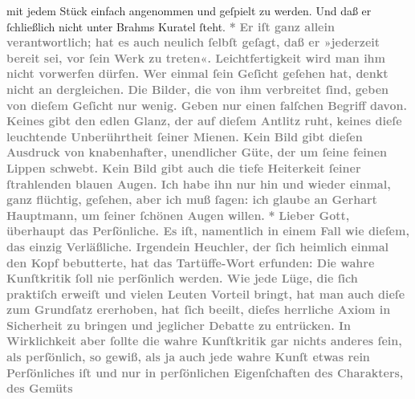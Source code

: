 \begin{ledgroupsized}[t]{13cm}
{{                  mit jedem Stück einfach angenommen und geſpielt zu werden. Und daß er ſchließlich
                  nicht unter Brahms Kuratel ſteht.}}\pend
           \pstart
           \centering{}\textcolor{gray}{\textbf{*}}\pend
           \pstart
           \noindent{}\textcolor{gray}{\textbf{Er iſt ganz allein verantwortlich; hat es auch neulich ſelbſt
                  geſagt, daß er »jederzeit bereit sei, vor ſein Werk zu treten«. Leichtfertigkeit
                  wird man ihm nicht vorwerfen dürfen. Wer einmal ſein Geſicht geſehen hat, denkt
                  nicht an dergleichen. Die Bilder, die von ihm verbreitet ſind, geben von dieſem
                  Geſicht nur wenig. Geben nur einen falſchen Begriff davon. Keines gibt den edlen
                  Glanz, der auf dieſem Antlitz ruht, keines dieſe leuchtende Unberührtheit ſeiner
                  Mienen. Kein Bild gibt dieſen Ausdruck von knabenhafter, unendlicher Güte, der um
                  ſeine feinen Lippen schwebt. Kein Bild gibt auch die tiefe Heiterkeit ſeiner
                  ſtrahlenden blauen Augen. Ich habe ihn nur hin und wieder einmal, ganz flüchtig,
                  geſehen, aber ich muß ſagen: ich glaube {\pb}an Gerhart Hauptmann, um ſeiner ſchönen Augen willen.}}\pend
           \pstart
           \centering{}\textcolor{gray}{\textbf{*}}\pend
           \pstart
           \noindent{}\textcolor{gray}{\textbf{Lieber Gott, überhaupt das Perſönliche. Es iſt, namentlich in
                  einem Fall wie dieſem, das einzig Verläßliche. Irgendein Heuchler, der ſich
                  heimlich einmal den Kopf bebutterte, hat das Tartüffe-Wort erfunden: Die wahre Kunſtkritik ſoll nie
                  perſönlich werden. Wie jede Lüge, die ſich praktiſch erweiſt und vielen Leuten
                  Vorteil bringt, hat man auch dieſe zum Grundſatz ererhoben, hat ſich beeilt,
                  dieſes herrliche Axiom in Sicherheit zu bringen und jeglicher Debatte zu
                  entrücken. In Wirklichkeit aber ſollte die wahre Kunſtkritik gar nichts anderes
                  ſein, als perſönlich, so gewiß, als ja auch jede wahre Kunſt etwas rein
                  Perſönliches iſt und nur in perſönlichen Eigenſchaften des Charakters, des Gemüts
}}
\end{ledgroupsized}
